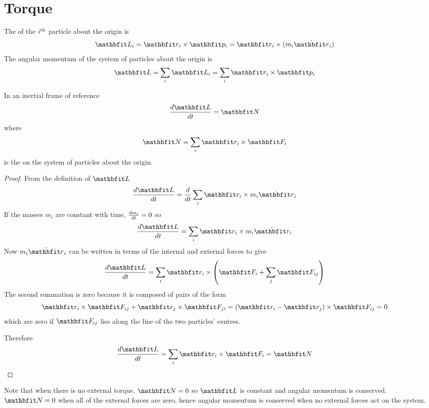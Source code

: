 \section{Torque}

The  of the $i^{\rm th}$ particle about the origin is
$$\vect{L}_i=\vect{r}_i\times\vect{p}_i
=\vect{r}_i\times(m_i\dot{\vect{r}}_i)$$
The angular momentum of the system of particles about the origin is
$$\vect{L}=\sum_i\vect{L}_i=\sum_i\vect{r}_i\times\vect{p}_i$$

\begin{theorem}
In an inertial frame of reference
$$\der{\vect{L}}{t}=\vect{N}$$
where
$$\vect{N}=\sum_i\vect{r}_i\times\vect{F}_i$$
is the  on the system of particles about the
origin.
\end{theorem}
\begin{proof}
From the definition of $\vect{L}$
$$\der{\vect{L}}{t}=\dbd{t}\sum_i\vect{r}_i\times m_i\dot{\vect{r}}_i$$
If the masses $m_i$ are constant with time, $\frac{dm_i}{dt}=0$ so
$$\der{\vect{L}}{t}=\sum_i\vect{r}_i\times m_i\ddot{\vect{r}}_i$$
Now $m_i\ddot{\vect{r}}_i$ can be written in terms of the internal and
external forces to give
$$\der{\vect{L}}{t}=\sum_i\vect{r}_i\times\left(\vect{F}_i+\sum_j
\vect{F}_{ij}\right)$$
The second summation is zero because it is composed of pairs of the form
$$\vect{r}_i\times\vect{F}_{ij}+\vect{r}_j\times\vect{F}_{ji}
=(\vect{r}_i-\vect{r}_j)\times\vect{F}_{ij}=0$$
which are zero if $\vect{F}_{ij}$ lies along the line of the two particles'
centres.  

Therefore
$$\der{\vect{L}}{t}=\sum_i\vect{r}_i\times\vect{F}_i=\vect{N}$$
\end{proof}

Note that when there is no external torque, $\vect{N}=0$ so $\vect{L}$ is
constant and angular momentum is conserved.  $\vect{N}=0$ when all of 
the external forces are zero, hence angular momentum is conserved when no
external forces act on the system.

